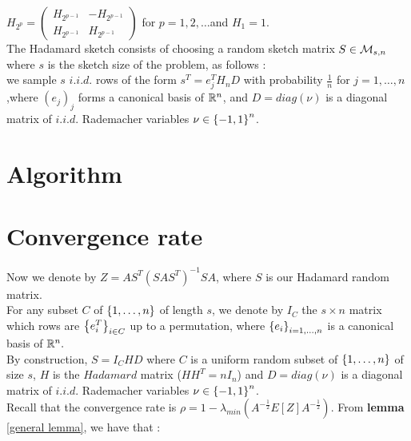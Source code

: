 $H_{2^{p}} = \begin{pmatrix} H_{2^{p-1}} & - H_{2^{p-1}} \\
					H_{2^{p-1}} & H_{2^{p-1}}  \end{pmatrix} $ for $p=1,2,\dots$and $H_{1} = 1.$\\

The Hadamard sketch consists of choosing a random sketch matrix $S \in {\mathcal M}_{s,n}$ where $s$ is the sketch size of the problem, as follows :\\ 
we sample $s$ $i.i.d.$ rows of the form $s^{T} = e_{j}^{T}H_{n} D $ with probability $\frac 1n$ for $j = 1,\dots,n$,where $(e_{j})_{j}$ forms a canonical basis of ${\mathbb R}^{n}$, and $D = diag(\nu)$ is a diagonal matrix of $i.i.d.$ Rademacher variables $\nu \in \left\{-1,1\right\}^{n}$.  


\section{Algorithm}


\section{Convergence rate}



Now we denote by $Z = A S^{T} (S A S^{T})^{-1} S A$, where $S$ is our Hadamard random matrix.\\
For any subset $C$ of $\left\{1,\dots,n\right\}$ of length $s$, we denote by $I_{C}$ the $s\times n$ matrix which rows are $\left\{e_{i}^{T}\right\}_{i\in C}$ up to a permutation, where $\left\{e_{i}\right\}_{i=1,\dots,n}$ is a canonical basis of ${\mathbb R}^{n}.$\\ 

By construction, $S = I_{C} H D$ where $C$ is a uniform random subset of $\left\{1,\dots,n\right\}$ of size $s$,  $H$ is the $Hadamard$ matrix ($H H^{T} = n I_{n}$) and $D = diag(\nu)$ is a diagonal matrix of $i.i.d.$ Rademacher variables $\nu \in \left\{-1,1\right\}^{n}$. \\

Recall that the convergence rate is  $\rho = 1 - \lambda_{min}(A^{-\frac12}E[Z]A^{-\frac12}  )$. From \textbf{lemma} \ref{general lemma}, we have that :

\pr

